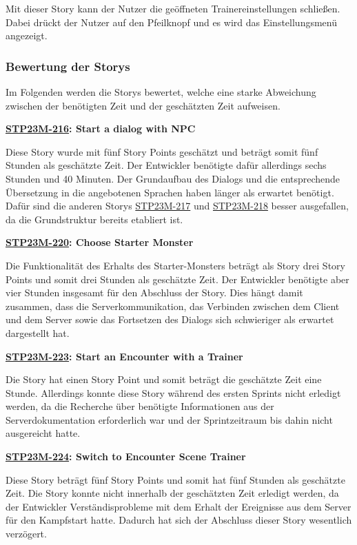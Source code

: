 Mit dieser Story kann der Nutzer die geöffneten Trainereinstellungen schließen. Dabei drückt der Nutzer auf den Pfeilknopf und es wird das Einstellungsmenü angezeigt.
\subsubsection{Bewertung der Storys}

Im Folgenden werden die Storys bewertet, welche eine starke Abweichung zwischen der benötigten Zeit und der geschätzten Zeit aufweisen.

\textbf{\hyperlink{T216}{\hypertarget{S216}{STP23M-216}}: Start a dialog with NPC}

Diese Story wurde mit fünf Story Points geschätzt und beträgt somit fünf Stunden als geschätzte Zeit. Der Entwickler benötigte dafür allerdings sechs Stunden und 40 Minuten. Der Grundaufbau des Dialogs und die entsprechende Übersetzung in die angebotenen Sprachen haben länger als erwartet benötigt. Dafür sind die anderen Storys \hyperlink{T217}{\hypertarget{S217}{STP23M-217}} und \hyperlink{T218}{\hypertarget{S218}{STP23M-218}} besser ausgefallen, da die Grundstruktur bereits etabliert ist.

\textbf{\hyperlink{T220}{\hypertarget{S220}{STP23M-220}}: Choose Starter Monster}

Die Funktionalität des Erhalts des Starter-Monsters beträgt als Story drei Story Points und somit drei Stunden als geschätzte Zeit. Der Entwickler benötigte aber vier Stunden insgesamt für den Abschluss der Story. Dies hängt damit zusammen, dass die Serverkommunikation, das Verbinden zwischen dem Client und dem Server sowie das Fortsetzen des Dialogs sich schwieriger als erwartet dargestellt hat.

\textbf{\hyperlink{T223}{\hypertarget{S223}{STP23M-223}}: Start an Encounter with a Trainer}

Die Story hat einen Story Point und somit beträgt die geschätzte Zeit eine Stunde. Allerdings konnte diese Story während des ersten Sprints nicht erledigt werden, da die Recherche über benötigte Informationen aus der Serverdokumentation erforderlich war und der Sprintzeitraum bis dahin nicht ausgereicht hatte.

\textbf{\hyperlink{T224}{\hypertarget{S224}{STP23M-224}}: Switch to Encounter Scene Trainer}

Diese Story beträgt fünf Story Points und somit hat fünf Stunden als geschätzte Zeit. Die Story konnte nicht innerhalb der geschätzten Zeit erledigt werden, da der Entwickler Verständisprobleme mit dem Erhalt der Ereignisse aus dem Server für den Kampfstart hatte. Dadurch hat sich der Abschluss dieser Story wesentlich verzögert.

